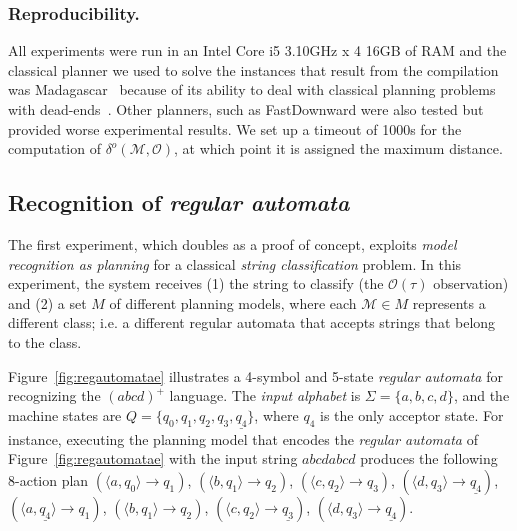 \documentclass[letterpaper]{article} %
\begin{document}
\subsubsection{Reproducibility.} All experiments were run in an Intel Core i5 3.10GHz x 4 16GB of RAM and the classical planner we used to solve the instances that result from the compilation was {\sc Madagascar}~\cite{rintanen2014madagascar} because of its ability to deal with classical planning problems with dead-ends~\cite{lopez2015deterministic}. Other planners, such as FastDownward were also tested but provided worse experimental results. We set up a timeout of 1000s for the computation of $\delta^o(\mathcal{M},\mathcal{O})$, at which point it is assigned the maximum distance.


\subsection{Recognition of {\em regular automata}} The first experiment, which doubles as a proof of concept, exploits {\em model recognition as planning} for a classical {\em string classification} problem. In this experiment, the system receives (1) the string to classify (the $\mathcal{O}(\tau)$ observation) and (2) a set $M$ of different planning models, where each $\mathcal{M}\in M$ represents a different class; i.e. a different regular automata that accepts strings that belong to the class.

Figure~\ref{fig:regautomatae} illustrates a 4-symbol and 5-state {\em regular automata} for recognizing the $(abcd)^+$ language. The {\em input alphabet} is $\Sigma=\{a,b,c,d\}$, and the machine states are $Q=\{q_0,q_1,q_2,q_3,\underline{q_4}\}$, where \underline{$q_4$} is the only acceptor state. For instance, executing the planning model that encodes the {\em regular automata} of Figure~\ref{fig:regautomatae} with the input string $abcdabcd$ produces the following 8-action plan {\small $(\langle a,q_0\rangle\rightarrow q_1)$, $(\langle b,q_1\rangle\rightarrow q_2)$, $(\langle c,q_2\rangle\rightarrow q_3)$, $(\langle d,q_3\rangle\rightarrow \underline{q_4})$, $(\langle a,\underline{q_4}\rangle\rightarrow q_1)$, $(\langle b,q_1\rangle\rightarrow q_2)$, $(\langle c,q_2\rangle\rightarrow \underline{q_3})$, $(\langle d,q_3\rangle\rightarrow \underline{q_4})$}.
\end{document}
